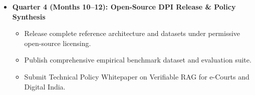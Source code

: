 \documentclass[12pt,a4paper,oneside]{report}
\begin{document}
\begin{itemize}[itemsep=3pt]
\begin{itemize}[itemsep=1pt]
        \item Proposed pilot targets: 10 Common Service Centers (CSCs) and 2 District Legal Services Authorities (DLSAs), subject to Institutional Review and formal MoUs with State E-Governance Missions and State Legal Services Authorities.
        \item Hybrid edge architecture: offline local edge processing for document intelligence, with optional online uplink to Government of India Bhashini APIs.
    \end{itemize}
    \item \textbf{Quarter 4 (Months 10--12): Open-Source DPI Release \& Policy Synthesis}
    \begin{itemize}[itemsep=1pt]
        \item Release complete reference architecture and datasets under permissive open-source licensing.
        \item Publish comprehensive empirical benchmark dataset and evaluation suite.
        \item Submit Technical Policy Whitepaper on Verifiable RAG for e-Courts and Digital India.
    \end{itemize}
\end{itemize}

\newpage
\end{document}
